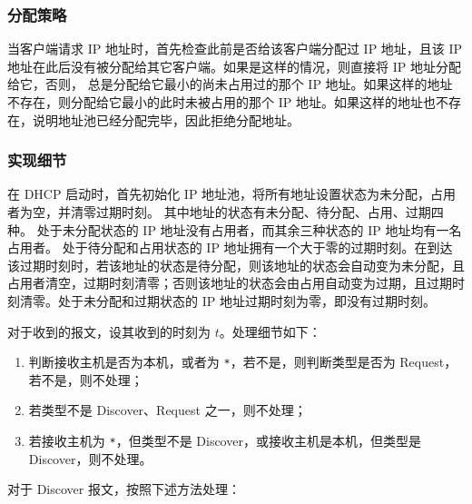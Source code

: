 \subsubsection*{分配策略}

当客户端请求 IP 地址时，首先检查此前是否给该客户端分配过 IP 地址，且该 IP 地址在此后没有被分配给其它客户端。如果是这样的情况，则直接将 IP 地址分配给它，否则，
总是分配给它最小的尚未占用过的那个 IP 地址。如果这样的地址不存在，则分配给它最小的此时未被占用的那个 IP 地址。如果这样的地址也不存在，说明地址池已经分配完毕，因此拒绝分配地址。

\subsubsection*{实现细节}

在 DHCP 启动时，首先初始化 IP 地址池，将所有地址设置状态为未分配，占用者为空，并清零过期时刻。
其中地址的状态有未分配、待分配、占用、过期四种。
处于未分配状态的 IP 地址没有占用者，而其余三种状态的 IP 地址均有一名占用者。
处于待分配和占用状态的 IP 地址拥有一个大于零的过期时刻。在到达该过期时刻时，若该地址的状态是待分配，则该地址的状态会自动变为未分配，且占用者清空，过期时刻清零；否则该地址的状态会由占用自动变为过期，且过期时刻清零。处于未分配和过期状态的 IP 地址过期时刻为零，即没有过期时刻。

对于收到的报文，设其收到的时刻为 $t$。处理细节如下：

\begin{enumerate}

    \item 判断接收主机是否为本机，或者为 \verb|*|，若不是，则判断类型是否为 Request，若不是，则不处理；

    \item 若类型不是 Discover、Request 之一，则不处理；

    \item 若接收主机为 \verb|*|，但类型不是 Discover，或接收主机是本机，但类型是 Discover，则不处理。

\end{enumerate}

对于 Discover 报文，按照下述方法处理：

